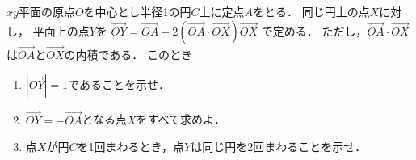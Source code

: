 \documentclass[../../main.tex]{subfiles}
\begin{document}
$xy$平面の原点$O$を中心とし半径1の円$C$上に定点$A$をとる．
同じ円上の点$X$に対し，
平面上の点$Y$を
$\overrightarrow{OY}=\overrightarrow{OA}-2(\overrightarrow{OA}\cdot\overrightarrow{OX})\overrightarrow{OX}$
で定める．
ただし，$\overrightarrow{OA}\cdot\overrightarrow{OX}$は$\overrightarrow{OA}$と$\overrightarrow{OX}$の内積である．
このとき
\begin{enumerate}
  \item $|\overrightarrow{OY}|=1$であることを示せ．
  \item $\overrightarrow{OY}=-\overrightarrow{OA}$となる点$X$をすべて求めよ．
  \item 点$X$が円$C$を1回まわるとき，点$Y$は同じ円を2回まわることを示せ．
\end{enumerate}
\end{document}
